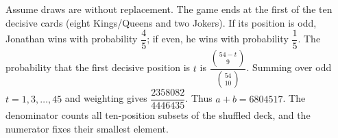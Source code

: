 Assume draws are without replacement. The game ends at the first of the ten decisive cards (eight Kings/Queens and two Jokers). If its position is odd, Jonathan wins with probability $\dfrac{4}{5}$; if even, he wins with probability $\dfrac{1}{5}$. The probability that the first decisive position is $t$ is $\dfrac{\binom{54-t}{9}}{\binom{54}{10}}$. Summing over odd $t=1,3,\ldots,45$ and weighting gives $\dfrac{2358082}{4446435}$. Thus $\boxed{a+b=6804517}$. The denominator counts all ten-position subsets of the shuffled deck, and the numerator fixes their smallest element.
